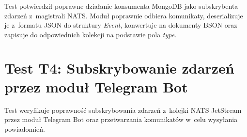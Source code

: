 Test potwierdził poprawne działanie konsumenta MongoDB jako subskrybenta zdarzeń z~magistrali NATS\@.
Moduł poprawnie odbiera komunikaty, deserializuje je z~formatu JSON do struktury \textit{Event}, konwertuje na
dokumenty BSON oraz zapisuje do odpowiednich kolekcji na podstawie pola \textit{type}.

\newpage


\section{Test T4: Subskrybowanie zdarzeń przez moduł Telegram Bot}
\label{sec:test_telegram_subscribe}

Test weryfikuje poprawność subskrybowania zdarzeń z~kolejki NATS JetStream przez moduł Telegram Bot oraz przetwarzania
komunikatów w~celu wysyłania powiadomień.

\vspace{0.5cm}

